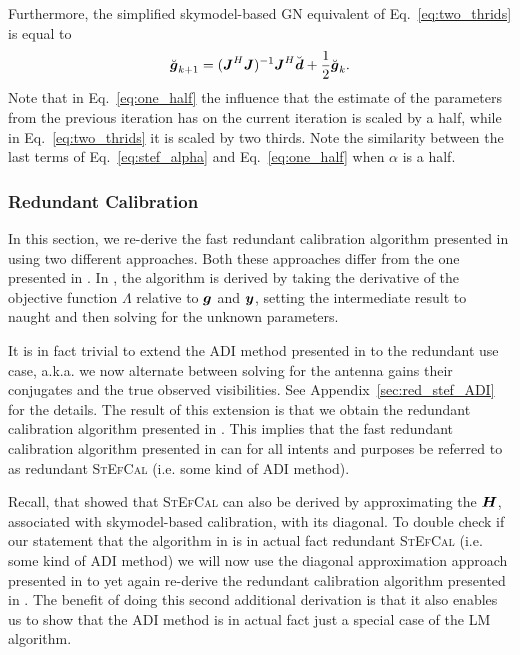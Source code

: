 \documentclass[useAMS,usenatbib]{mn2e}
\newcommand{\bg}{\bmath{g}}
\newcommand{\bd}{\bmath{d}}
\newcommand{\by}{\bmath{y}}
\newcommand{\bJ}{\bmath{J}}
\newcommand{\bH}{\bmath{H}}
\begin{document}
Furthermore, the simplified skymodel-based GN equivalent of Eq.~\eqref{eq:two_thrids} is equal to
\citep{Smirnov2015}
\begin{equation}
\label{eq:one_half}
\breve{\bg}_{k+1} = (\bJ^H\bJ)^{-1}\bJ^H\breve{\bd} + \frac{1}{2}\breve{\bg}_{k}. 
\end{equation}
Note that in Eq.~\eqref{eq:one_half} the influence that the estimate of the parameters from the previous iteration has on the current iteration is scaled by a half, while
in Eq.~\eqref{eq:two_thrids} it is scaled by two thirds. Note the similarity between the last terms of Eq.~\eqref{eq:stef_alpha} and Eq.~\eqref{eq:one_half} when $\alpha$ is a half.

\subsubsection{Redundant Calibration}
\label{sec:red_c}
In this section, we re-derive the fast redundant calibration algorithm presented in \citet{Marthi2014} using two different approaches. Both these approaches differ from the one presented in \citet{Marthi2014}. In \citet{Marthi2014}, the algorithm is derived by taking the derivative of the 
objective function $\Lambda$ relative to $\bg$ and $\by$, setting the intermediate result to naught and then solving for the unknown parameters. 

It is in fact trivial to extend the ADI method presented in \citet{Salvini2014} to the redundant use case, a.k.a. we now alternate between solving for the antenna gains their conjugates and the true observed visibilities.
See Appendix~\ref{sec:red_stef_ADI} for the details. The result of this extension is that we obtain the redundant calibration algorithm presented in \citet{Marthi2014}. This implies that the fast redundant calibration algorithm presented in \citet{Marthi2014} can for all intents and purposes be referred to as redundant \textsc{StEfCal} (i.e. some kind of ADI method).

Recall, that \citet{Smirnov2015} showed that \textsc{StEfCal} can also be derived by approximating the $\bH$, associated with skymodel-based calibration, with 
its diagonal. To double check if our statement that the algorithm in \citet{Marthi2014} is in actual fact redundant \textsc{StEfCal} (i.e. some kind of ADI method) we will now use the diagonal approximation approach presented in \citet{Smirnov2015} to yet again re-derive the redundant calibration algorithm presented in \citet{Marthi2014}.
The benefit of doing this second additional derivation is that it also enables us to show that the ADI method is in actual fact just a special case of the LM algorithm.
\end{document}
